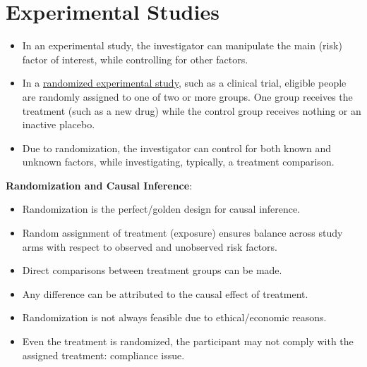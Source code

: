 \section{Experimental Studies}
\begin{itemize}
      \item In an experimental study, the investigator can manipulate the
            main (risk) factor of interest, while controlling for other
            factors.
      \item In a \underline{randomized experimental study}, such as a clinical trial,
            eligible people are randomly assigned to one of two or more
            groups. One group receives the treatment (such as a new
            drug) while the control group receives nothing or an inactive
            placebo.
      \item Due to randomization, the investigator can control for both
            known and unknown factors, while investigating, typically, a
            treatment comparison.
\end{itemize}
\textbf{Randomization and Causal Inference}:
\begin{itemize}
      \item Randomization is the perfect/golden design for causal
            inference.
      \item Random assignment of treatment (exposure) ensures balance
            across study arms with respect to observed and unobserved
            risk factors.
      \item Direct comparisons between treatment groups can be made.
      \item Any difference can be attributed to the causal effect of
            treatment.
      \item Randomization is not always feasible due to ethical/economic
            reasons.
      \item Even the treatment is randomized, the participant may not
            comply with the assigned treatment: compliance issue.
\end{itemize}
